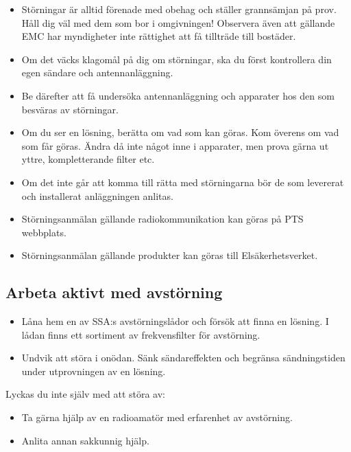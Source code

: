 \begin{itemize}
	\item Störningar är alltid förenade med obehag och ställer grannsämjan på prov.
	Håll dig väl med dem som bor i omgivningen! Observera även att gällande EMC
	har myndigheter inte rättighet att få tillträde till bostäder.
	\item Om det väcks klagomål på dig om störningar, ska du först
	kontrollera din egen sändare och antennanläggning.
	\item Be därefter att få undersöka antennanläggning och apparater hos
	den som besväras av störningar.
	\item Om du ser en lösning, berätta om vad som kan göras.
	Kom överens om vad som får göras.
	Ändra då inte något inne i apparater, men prova gärna ut yttre,
	kompletterande filter etc.
	\item Om det inte går att komma till rätta med störningarna bör de som
	levererat och installerat anläggningen anlitas.
	\item Störningsanmälan gällande radiokommunikation kan göras på PTS webbplats.
	\item Störningsanmälan gällande produkter kan göras till Elsäkerhetsverket.
\end{itemize}

\subsection{Arbeta aktivt med avstörning}

\begin{itemize}
	\item Låna hem en av SSA:s avstörningslådor och försök att finna en lösning.
	I lådan finns ett sortiment av frekvensfilter för avstörning.
	\item Undvik att störa i onödan.
	Sänk sändareffekten och begränsa sändningstiden under utprovningen av en
	lösning.
\end{itemize}
Lyckas du inte själv med att störa av:
\begin{itemize}
	\item Ta gärna hjälp av en radioamatör med erfarenhet av avstörning.
	\item Anlita annan sakkunnig hjälp.
\end{itemize}
